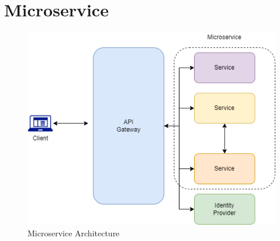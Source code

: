 \documentclass[BIF,Bachelor,nenglish]{twbook}%
\begin{document}
\section{Microservice}
\begin{figure} [H]
 \begin{center}
    \includegraphics[width=1\linewidth]{img/Microservice_2.png}
 \end{center}
 \caption{Microservice Architecture}
 \label{microservice}
\end{figure}
\end{document}
